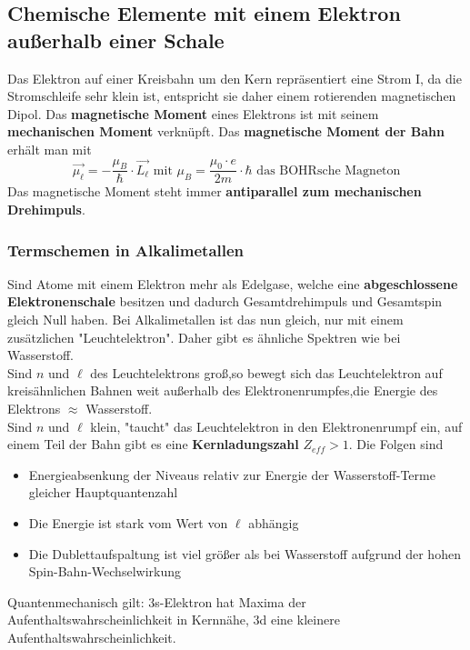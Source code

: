 \documentclass[12pt,a4paper,ngerman]{article}
\begin{document}
\pagebreak

\subsection{Chemische Elemente mit einem Elektron außerhalb einer Schale}
Das Elektron auf einer Kreisbahn um den Kern repräsentiert eine Strom I, da die Stromschleife sehr klein ist, entspricht sie daher einem rotierenden magnetischen Dipol. Das \textbf{magnetische Moment} eines Elektrons ist mit seinem \textbf{mechanischen Moment} verknüpft. Das \textbf{magnetische Moment der Bahn} erhält man mit
\begin{equation}
\vec{\mu_\ell} = -\frac{\mu_B}{\hbar} \cdot \vec{L_\ell} \text{  mit  } \mu_B = \frac{\mu_0\cdot e}{2m} \cdot \hbar \text{ das BOHRsche Magneton}
\end{equation}
Das magnetische Moment steht immer \textbf{antiparallel zum mechanischen Drehimpuls}. \\
\subsubsection*{Termschemen in Alkalimetallen}
Sind Atome mit einem Elektron mehr als Edelgase, welche eine \textbf{abgeschlossene Elektronenschale} besitzen und dadurch Gesamtdrehimpuls und Gesamtspin gleich Null haben. Bei Alkalimetallen ist das nun gleich, nur mit einem zusätzlichen "Leuchtelektron". Daher gibt es ähnliche Spektren wie bei Wasserstoff. \\
Sind $n$ und $\ell$ des Leuchtelektrons groß,so bewegt sich das Leuchtelektron auf kreisähnlichen Bahnen weit außerhalb des Elektronenrumpfes,die Energie des Elektrons $\approx$ Wasserstoff. \\
Sind $n$ und $\ell$ klein, "taucht" das Leuchtelektron in den Elektronenrumpf ein, auf einem Teil der Bahn gibt es eine \textbf{Kernladungszahl} $Z_{eff} > 1$. Die Folgen sind
\begin{itemize}
\item Energieabsenkung der Niveaus relativ zur Energie der Wasserstoff-Terme gleicher Hauptquantenzahl
\item Die Energie ist stark vom Wert von $\ell$ abhängig
\item Die Dublettaufspaltung ist viel größer als bei Wasserstoff aufgrund der hohen Spin-Bahn-Wechselwirkung
\end{itemize}
Quantenmechanisch gilt: 3s-Elektron hat Maxima der Aufenthaltswahrscheinlichkeit in Kernnähe, 3d eine kleinere Aufenthaltswahrscheinlichkeit. 
\end{document}
